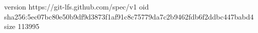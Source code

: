 version https://git-lfs.github.com/spec/v1
oid sha256:5ec07bc80e50b9df9d3873f1af91c8c75779da7c2b9462fdb6f2ddbc447babd4
size 113995
